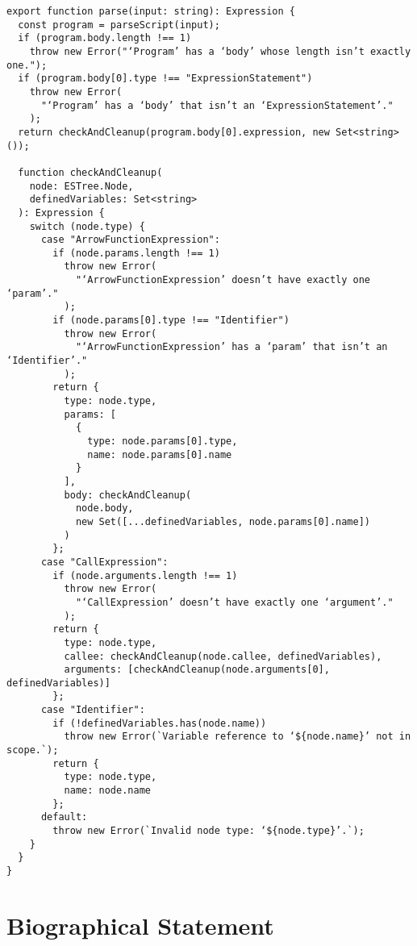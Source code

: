 \documentclass[12pt, oneside]{book}
\begin{document}
\begin{verbatim}
export function parse(input: string): Expression {
  const program = parseScript(input);
  if (program.body.length !== 1)
    throw new Error("‘Program’ has a ‘body’ whose length isn’t exactly one.");
  if (program.body[0].type !== "ExpressionStatement")
    throw new Error(
      "‘Program’ has a ‘body’ that isn’t an ‘ExpressionStatement’."
    );
  return checkAndCleanup(program.body[0].expression, new Set<string>());

  function checkAndCleanup(
    node: ESTree.Node,
    definedVariables: Set<string>
  ): Expression {
    switch (node.type) {
      case "ArrowFunctionExpression":
        if (node.params.length !== 1)
          throw new Error(
            "‘ArrowFunctionExpression’ doesn’t have exactly one ‘param’."
          );
        if (node.params[0].type !== "Identifier")
          throw new Error(
            "‘ArrowFunctionExpression’ has a ‘param’ that isn’t an ‘Identifier’."
          );
        return {
          type: node.type,
          params: [
            {
              type: node.params[0].type,
              name: node.params[0].name
            }
          ],
          body: checkAndCleanup(
            node.body,
            new Set([...definedVariables, node.params[0].name])
          )
        };
      case "CallExpression":
        if (node.arguments.length !== 1)
          throw new Error(
            "‘CallExpression’ doesn’t have exactly one ‘argument’."
          );
        return {
          type: node.type,
          callee: checkAndCleanup(node.callee, definedVariables),
          arguments: [checkAndCleanup(node.arguments[0], definedVariables)]
        };
      case "Identifier":
        if (!definedVariables.has(node.name))
          throw new Error(`Variable reference to ‘${node.name}’ not in scope.`);
        return {
          type: node.type,
          name: node.name
        };
      default:
        throw new Error(`Invalid node type: ‘${node.type}’.`);
    }
  }
}
\end{verbatim}

\backmatter




\chapter{Biographical Statement}

\end{document}
